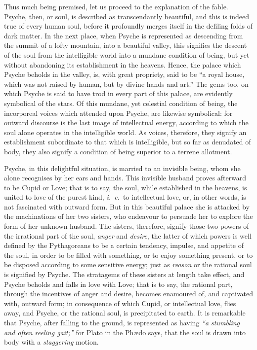 \documentclass[12pt]{article}
\begin{document}
{Thus much being premised, let us proceed to the explanation of the fable.
Psyche, then, or soul, is described as transcendantly beautiful, and this is
indeed true of every human soul, before it profoundly merges itself in the
defiling folds of dark matter. In the next place, when Psyche is represented as
descending from the summit of a lofty mountain, into a beautiful valley, this
signifies the descent of the soul from the intelligible world into a mundane
condition of being, but yet without abandoning its establishment in the
heavens. Hence, the palace which Psyche beholds in the valley, is, with great
propriety, said to be ``a royal house, which was not raised by human, but by
divine hands and art.'' The gems too, on which Psyche is said to have trod in
every part of this palace, are evidently symbolical of the stars. Of this
mundane, yet celestial condition of being, the incorporeal voices which
attended upon Psyche, are likewise symbolical: for outward discourse is the
last image of intellectual energy, according to which the soul alone operates
in the intelligible world. As voices, therefore, they signify an establishment
subordinate to that which is intelligible, but so far as denudated of body,
they also signify a condition of being superior to a terrene allotment.

Psyche, in this delightful situation, is married to an invisible being, whom
she alone recognises by her ears and hands. This invisible husband proves
afterward to be Cupid or Love; that is to say, the soul, while established in
the heavens, is united to love of the purest kind, \textit{i.~e.}~to
intellectual love, or, in other words, is not fascinated with outward form. But
in this beautiful palace she is attacked by the machinations of her two
sisters, who endeavour to persuade her to explore the form of her unknown
husband. The sisters, therefore, signify those two powers of the irrational
part of the soul, \textit{anger} and \textit{desire}, the latter of which
powers is well defined by the Pythagoreans to be a certain tendency, impulse,
and appetite of the soul, in order to be filled with something, or to enjoy
something present, or to be disposed according to some sensitive energy; just
as \textit{reason} or the rational soul is signified by Psyche. The stratagems
of these sisters at length take effect, and Psyche beholds and falls in love
with Love; that is to say, the rational part, through the incentives of anger
and desire, becomes enamoured of, and captivated with, outward form; in
consequence of which Cupid, or intellectual love, flies away, and Psyche, or
the rational soul, is precipitated to earth. It is remarkable that Psyche,
after falling to the ground, is represented as having \textit{``a stumbling and
often reeling gait;''} for Plato in the Ph{\ae}do says, that the soul is drawn
into body with a \textit{staggering} motion.

}
\end{document}
